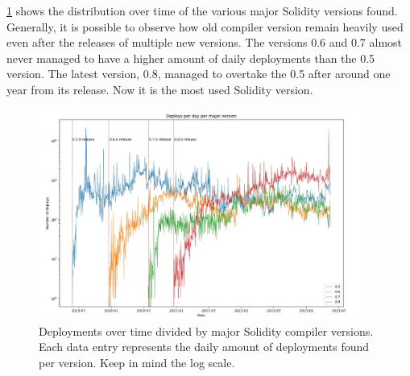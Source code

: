 \cref{fig:deploys-per-solidity-version} shows the distribution over time of the various major Solidity versions found. 
Generally, it is possible to observe how old compiler version remain heavily used even after the releases of multiple new versions.
The versions 0.6 and 0.7 almost never managed to have a higher amount of daily deployments than the 0.5 version.
The latest version, 0.8, managed to overtake the 0.5 after around one year from its release. Now it is the most used Solidity version.

\begin{figure}[ht]
    \centering
    \includegraphics[width=0.95\textwidth]{Figures/analysis/deploys_per_day_per_major.jpg}
    \caption{Deployments over time divided by major Solidity compiler versions. Each data entry represents the daily amount of deployments found per version. Keep in mind the log scale.}
    \label{fig:deploys-per-solidity-version}
\end{figure}




